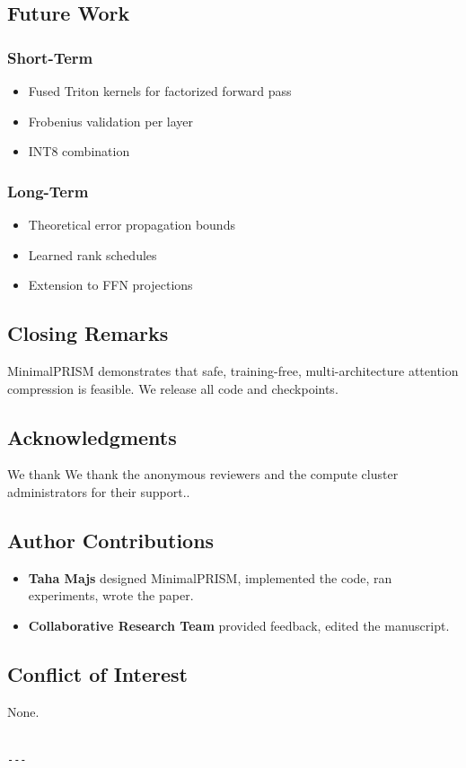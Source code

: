 \subsection{Future Work}

\subsubsection{Short-Term}
\begin{itemize}
\item Fused Triton kernels for factorized forward pass
\item Frobenius validation per layer
\item INT8 combination

\end{itemize}
\subsubsection{Long-Term}
\begin{itemize}
\item Theoretical error propagation bounds
\item Learned rank schedules
\item Extension to FFN projections

\end{itemize}
\subsection{Closing Remarks}

MinimalPRISM demonstrates that safe, training-free, multi-architecture 
attention compression is feasible. We release all code and checkpoints.

\subsection{Acknowledgments}

We thank We thank the anonymous reviewers and the compute cluster administrators for their support..

\subsection{Author Contributions}

\begin{itemize}
\item \textbf{Taha Majs} designed MinimalPRISM, implemented the code, ran
  experiments, wrote the paper.
\item \textbf{Collaborative Research Team} provided feedback, edited the manuscript.

\end{itemize}
\subsection{Conflict of Interest}

None.
\begin{lstlisting}

---
\end{lstlisting}